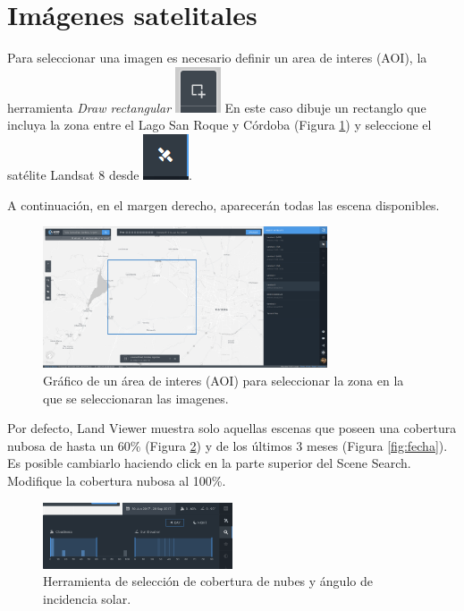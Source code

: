 \documentclass[a4paper,12pt]{book}
\begin{document}
\section{Imágenes satelitales}
Para seleccionar una imagen es necesario definir un area de interes (AOI), la herramienta \emph{Draw rectangular} \includegraphics[scale=0.2]{in:draw.png}
En este caso dibuje un rectanglo que incluya la zona entre el Lago San Roque y Córdoba (Figura \ref{fig:aoi}) y seleccione el satélite Landsat 8 desde \includegraphics[scale=0.2]{in:sat.png}.

A continuación, en el margen derecho, aparecerán todas las escena disponibles.

\begin{figure}[h!]
    \centering
    \includegraphics[width=0.75\textwidth]{fig:aoi.png}
    \caption{Gráfico de un área de interes (AOI) para seleccionar la zona en la que se seleccionaran las imagenes.}
    \label{fig:aoi}
\end{figure}

 Por defecto, Land Viewer muestra solo aquellas escenas que poseen una cobertura nubosa de hasta un 60\% (Figura \ref{fig:nube}) y de los últimos 3 meses (Figura \ref{fig:fecha}). Es posible cambiarlo haciendo click en la parte superior del Scene Search.  Modifique la cobertura nubosa al 100\%.

\begin{figure}[h!]
    \centering
    \includegraphics[width=0.5\textwidth]{fig:nube.png}
    \caption{Herramienta de selección de cobertura de nubes y ángulo de incidencia solar.}
    \label{fig:nube}
\end{figure}
\end{document}
